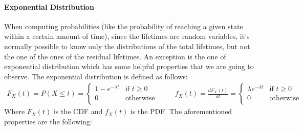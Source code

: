 \documentclass[12pt,a4paper]{article}
\begin{document}
\paragraph{Exponential Distribution}
When computing probabilities (like the probability of reaching a given state within a certain amount of time), since the lifetimes are random variables, it’s normally possible to know only the distributions of the total lifetimes, but not the one of the ones of the residual lifetimes. An exception is the one of exponential distribution which has some helpful properties that we are going to observe. The exponential distribution is defined as follows:
$$
\begin{matrix}
F_X(t)=P\left(X\leq t\right)=
\begin{cases}
1-e^{-\lambda t} & \textrm{if } t\geq 0 \\
0 & \textrm{otherwise} \\
\end{cases}
&&&
f_X(t)=\frac{dF_X(t)}{dt}=
\begin{cases}
\lambda e^{-\lambda t} & \textrm{if } t\geq 0 \\
0 & \textrm{otherwise} \\
\end{cases}
\end{matrix}
$$
Where $F_X(t)$ is the CDF and $f_X(t)$ is the PDF. The aforementioned properties are the following:
\end{document}
